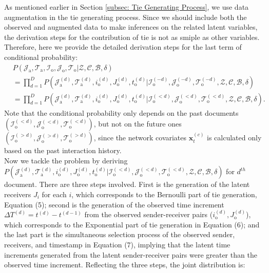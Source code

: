 \documentclass[a4paper]{article}
\begin{document}
  As mentioned earlier in Section \ref{subsec: Tie Generating Process}, we use data augmentation in the tie generating process. Since we should include both the observed and augmented data to make inferences on the related latent variables, the derivation steps for the contribution of tie is not as smiple as other variables. Therefore, here we provide the detailed derivation steps for the last term of conditional probability: 
 \begin{equation}
\begin{aligned}
&P(\mathcal{J}_{\mbox{a}}, \mathcal{T}_{\mbox{a}},\mathcal{I}_{\mbox{o}}, \mathcal{J}_{\mbox{o}}, \mathcal{T}_{\mbox{o}} |\mathcal{Z}, \mathcal{C}, \mathcal{B}, \delta)
\\& = \prod_{d=1}^D P(\mathcal{J}^{(d)}_{\mbox{a}}, \mathcal{T}^{(d)}_{\mbox{a}}, i^{(d)}_{\mbox{o}}, J^{(d)}_{\mbox{o}}, t^{(d)}_{\mbox{o}} |\mathcal{I}^{(-d)}_{\mbox{o}}, \mathcal{J}^{(-d)}_{\mbox{o}}, \mathcal{T}^{(-d)}_{\mbox{o}},\mathcal{Z}, \mathcal{C}, \mathcal{B}, \delta)
\\& = \prod_{d=1}^D P(\mathcal{J}^{(d)}_{\mbox{a}}, \mathcal{T}^{(d)}_{\mbox{a}}, i^{(d)}_{\mbox{o}}, J^{(d)}_{\mbox{o}}, t^{(d)}_{\mbox{o}} |\mathcal{I}^{(<d)}_{\mbox{o}}, \mathcal{J}^{(<d)}_{\mbox{o}}, \mathcal{T}^{(<d)}_{\mbox{o}},\mathcal{Z}, \mathcal{C}, \mathcal{B}, \delta).
\end{aligned}
 \end{equation}
 Note that the conditional probability only depends on the past documents $(\mathcal{I}^{(<d)}_{\mbox{o}}, \mathcal{J}^{(<d)}_{\mbox{o}}, \mathcal{T}^{(<d)}_{\mbox{o}})$, but not on the future ones $(\mathcal{I}^{(>d)}_{\mbox{o}}, \mathcal{J}^{(>d)}_{\mbox{o}}, \mathcal{T}^{(>d)}_{\mbox{o}})$, since the network covariates $\boldsymbol{x}_t^{(c)}$ is calculated only based on the past interaction history. \\ \newline
Now we tackle the problem by deriving $P(\mathcal{J}^{(d)}_{\mbox{a}}, \mathcal{T}^{(d)}_{\mbox{a}}, i^{(d)}_{\mbox{o}}, J^{(d)}_{\mbox{o}}, t^{(d)}_{\mbox{o}} |\mathcal{I}^{(<d)}_{\mbox{o}}, \mathcal{J}^{(<d)}_{\mbox{o}}, \mathcal{T}^{(<d)}_{\mbox{o}}, \mathcal{Z}, \mathcal{C}, \mathcal{B}, \delta)$ for $d^{th}$ document. There are three steps involved. First is the generation of the latent receivers $J_i$ for each $i$, which corresponds to the Bernoulli part of tie generation, Equation (5); second is the generation of the observed time increment $\Delta T^{(d)} = t^{(d)} - t^{(d-1)}$ from the observed sender-receiver pairs ($i^{(d)}_{\mbox{o}}, J^{(d)}_{\mbox{o}}$), which corresponds to the Exponential part of tie generation in Equation (6); and the last part is the simultaneous selection process of the observed sender, receivers, and timestamp in Equation (7), implying that the latent time increments generated from the latent sender-receiver pairs were greater than the observed time increment. Reflecting the three steps, the joint distribution is:\\
\end{document}

